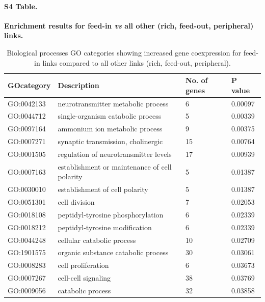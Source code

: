 \documentclass[10pt,letterpaper]{article}
\begin{document}
\paragraph*{S4 Table.}
{\bf Enrichment results for feed-in \textit{vs} all other (rich, feed-out, peripheral) links.}
\begin{table}[]
\centering
\caption{Biological processes GO categories showing increased gene coexpression for feed-in links compared to all other links (rich, feed-out, peripheral).}
\label{enrichmentFeedIN}
\begin{tabular}{llll}
\hline
\textbf{GOcategory} & \textbf{Description}                          & \textbf{No. of genes} & \textbf{P value} \\ \hline
GO:0042133          & neurotransmitter metabolic process            & 6                 & 0.00097       \\
GO:0044712          & single-organism catabolic process             & 5                 & 0.00339       \\
GO:0097164          & ammonium ion metabolic process                & 9                 & 0.00375       \\
GO:0007271          & synaptic transmission, cholinergic            & 15                & 0.00764       \\
GO:0001505          & regulation of neurotransmitter levels         & 17                & 0.00939       \\
GO:0007163          & establishment or maintenance of cell polarity & 5                 & 0.01387       \\
GO:0030010          & establishment of cell polarity                & 5                 & 0.01387       \\
GO:0051301          & cell division                                 & 7                 & 0.02053       \\
GO:0018108          & peptidyl-tyrosine phosphorylation             & 6                 & 0.02339       \\
GO:0018212          & peptidyl-tyrosine modification                & 6                 & 0.02339       \\
GO:0044248          & cellular catabolic process                    & 10                & 0.02709       \\
GO:1901575          & organic substance catabolic process           & 30                & 0.03061       \\
GO:0008283          & cell proliferation                            & 6                 & 0.03673       \\
GO:0007267          & cell-cell signaling                           & 38                & 0.03769       \\
GO:0009056          & catabolic process                             & 32                & 0.03858      
\end{tabular}
\end{table}
\end{document}
